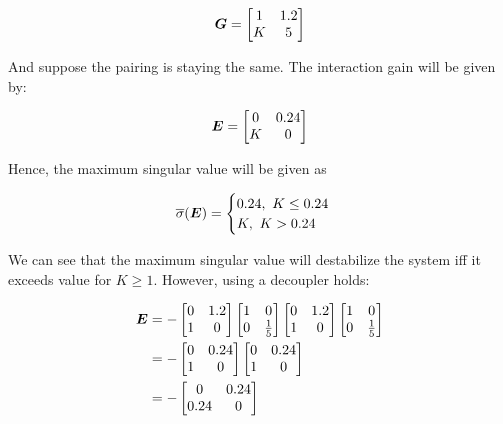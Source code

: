 \begin{align*}
\mbox{\boldmath$G$} = \begin{bmatrix}
1 & 1.2 \\
K & 5
\end{bmatrix}
\end{align*}

And suppose the pairing is staying the same. The interaction gain will be given by:

\begin{align*}
\mbox{\boldmath$E$} = \begin{bmatrix}
0 & 0.24 \\
K & 0 \\
\end{bmatrix}
\end{align*}

Hence, the maximum singular value will be given as

\begin{align*}
\overline{\sigma}(\mbox{\boldmath$E$}) = \begin{cases}
0.24 , ~K \leq 0.24 \\
K, ~K > 0.24
\end{cases}
\end{align*}

We can see that the maximum singular value will destabilize the system iff it exceeds value for $K \geq 1$. However, using a decoupler holds:

\begin{align*}
\begin{split}
\mbox{\boldmath$E$} &= - \begin{bmatrix}
0 & 1.2 \\
1 & 0 
\end{bmatrix}\begin{bmatrix}
1 & 0 \\ 0 & \frac{1}{5}
\end{bmatrix}\begin{bmatrix}
0 & 1.2 \\
1 & 0 
\end{bmatrix}\begin{bmatrix}
1 & 0 \\ 0 & \frac{1}{5}
\end{bmatrix} \\
&= -  \begin{bmatrix}
0 & 0.24 \\
1 & 0 
\end{bmatrix}\begin{bmatrix}
0 & 0.24 \\ 1 & 0
\end{bmatrix} \\
&= -\begin{bmatrix}
0 & 0.24 \\ 0.24 & 0
\end{bmatrix}
\end{split}
\end{align*}

